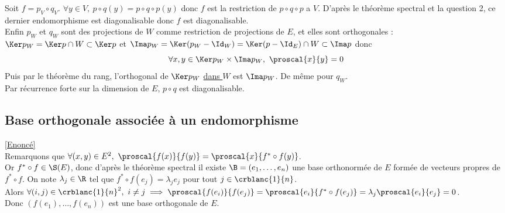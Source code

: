 \documentclass[8pt]{book}
\begin{document}
\begin{enumerate}[leftmargin=*]
		Soit $f=p_V\circ q_V$. $\forall y\in V,\ p\circ q(y)=p\circ q\circ p(y)$ donc $f$ est la restriction de $p\circ q\circ p$ a $V$. D'après le théorème spectral et la question 2, ce dernier endomorphisme est diagonalisable donc $f$ est diagonalisable.\\
		Enfin $p_W$ et $q_W$ sont des projections de $W$ comme restriction de projections de $E$, et elles sont orthogonales :\\
		$\Ker p_W=\Ker p\cap W\subset \Ker p$ et $\Ima p_W=\Ker(p_W-\Id_W)=\Ker(p-\Id_E)\cap W\subset \Ima p$ donc
		$$\forall x,y\in \Ker p_W\times \Ima p_W,\ \proscal{x}{y}=0$$
		Puis par le théorème du rang, l'orthogonal de $\Ker p_W$ \underline{dans $W$} est $\Ima p_W$. De même pour $q_W$.\\
		Par récurrence forte sur la dimension de $E$, $p\circ q$ est diagonalisable.
	\end{enumerate}
	
	\subsection{Base orthogonale associée à un endomorphisme }
	\label{Base orthogonale associée à un endomorphisme corrigé}
	\textcolor{blue}{\hyperref[Base orthogonale associée à un endomorphisme]{[Enoncé]}}\\
	Remarquons que $\forall (x,y)\in E^2,\ \proscal{f(x)}{f(y)}=\proscal{x}{f^*\circ f(y)}$.\\
	Or $f^*\circ f\in \S(E)$, donc d'après le théorème spectral il existe $\B=(e_1,\dots,e_n)$ une base orthonormée de $E$ formée de vecteurs propres de $f^*\circ f$. On note $\lambda_j\in \R$ tel que $f^*\circ f(e_j)=\lambda_je_j$ pour tout $j\in \crblanc{1}{n}$.\\
	Alors $\forall (i,j)\in \crblanc{1}{n}^2,\ i\ne j\implies \proscal{f(e_i)}{f(e_j)}=\proscal{e_i}{f^*\circ f(e_j)}=\lambda_j\proscal{e_i}{e_j}=0$.\\
	Donc $(f(e_1),\dots,f(e_n))$ est une base orthogonale de $E$.
	
\end{document}
